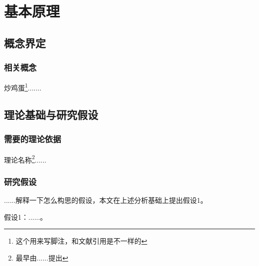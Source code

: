 \chapter{基本原理}
\section{概念界定}
\subsection{相关概念}
炒鸡蛋\footnote{这个用来写脚注，和文献引用是不一样的}.......

\section{理论基础与研究假设}
\subsection{需要的理论依据}
理论名称\footnote{最早由......提出}......

\subsection{研究假设}
......解释一下怎么构思的假设，本文在上述分析基础上提出假设1。

假设1：......。
